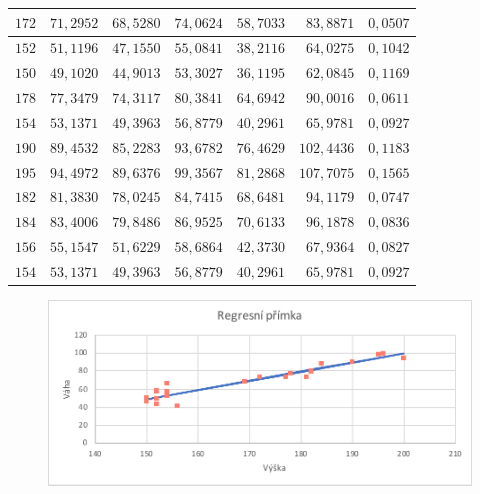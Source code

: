 \documentclass[a4paper, 11pt]{article}
\begin{document}
\begin{table}[H]
\begin{tabular}{|r|r|r|r|r|r|r|}
			$ 172 $ & $ 71,2952 $ & $ 68,5280 $ & $ 74,0624 $ & $ 58,7033 $
			& $ 83,8871 $ & $ 0,0507 $ \\ \hline

			$ 152 $ & $ 51,1196 $ & $ 47,1550 $ & $ 55,0841 $ & $ 38,2116 $
			& $ 64,0275 $ & $ 0,1042 $ \\ \hline

			$ 150 $ & $ 49,1020 $ & $ 44,9013 $ & $ 53,3027 $ & $ 36,1195 $
			& $ 62,0845 $ & $ 0,1169 $ \\ \hline

			$ 178 $ & $ 77,3479 $ & $ 74,3117 $ & $ 80,3841 $ & $ 64,6942 $
			& $ 90,0016 $ & $ 0,0611 $ \\ \hline

			$ 154 $ & $ 53,1371 $ & $ 49,3963 $ & $ 56,8779 $ & $ 40,2961 $
			& $ 65,9781 $ & $ 0,0927 $ \\ \hline

			$ 190 $ & $ 89,4532 $ & $ 85,2283 $ & $ 93,6782 $ & $ 76,4629 $
			& $ 102,4436 $ & $ 0,1183 $ \\ \hline

			$ 195 $ & $ 94,4972 $ & $ 89,6376 $ & $ 99,3567 $ & $ 81,2868 $
			& $ 107,7075 $ & $ 0,1565 $ \\ \hline

			$ 182 $ & $ 81,3830 $ & $ 78,0245 $ & $ 84,7415 $ & $ 68,6481 $
			& $ 94,1179 $ & $ 0,0747 $ \\ \hline

			$ 184 $ & $ 83,4006 $ & $ 79,8486 $ & $ 86,9525 $ & $ 70,6133 $
			& $ 96,1878 $ & $ 0,0836 $ \\ \hline

			$ 156 $ & $ 55,1547 $ & $ 51,6229 $ & $ 58,6864 $ & $ 42,3730 $
			& $ 67,9364 $ & $ 0,0827 $ \\ \hline

			$ 154 $ & $ 53,1371 $ & $ 49,3963 $ & $ 56,8779 $ & $ 40,2961 $
			& $ 65,9781 $ & $ 0,0927 $ \\ \hline
		\end{tabular}
	\end{table}

	\begin{figure}[H]
		\centering
		\includegraphics[width=.7 \linewidth]{img/2-c-3-reg-prim.pdf}
	\end{figure}
\end{document}
